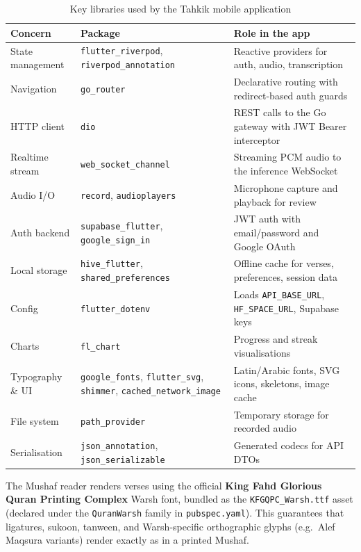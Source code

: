 \begin{table}[H]
  \centering
  \caption{Key libraries used by the Tahkik mobile application}
  \label{tab:impl_app_libs}
  \renewcommand{\arraystretch}{1.3}
  \begin{tabular}{lp{4.2cm}p{6cm}}
    \toprule
    \textbf{Concern} & \textbf{Package} & \textbf{Role in the app} \\
    \midrule
    State management & \texttt{flutter\_riverpod}, \texttt{riverpod\_annotation} & Reactive providers for auth, audio, transcription \\
    Navigation       & \texttt{go\_router}                & Declarative routing with redirect-based auth guards \\
    HTTP client      & \texttt{dio}                       & REST calls to the Go gateway with JWT Bearer interceptor \\
    Realtime stream  & \texttt{web\_socket\_channel}      & Streaming PCM audio to the inference WebSocket \\
    Audio I/O        & \texttt{record}, \texttt{audioplayers} & Microphone capture and playback for review \\
    Auth backend     & \texttt{supabase\_flutter}, \texttt{google\_sign\_in} & JWT auth with email/password and Google OAuth \\
    Local storage    & \texttt{hive\_flutter}, \texttt{shared\_preferences} & Offline cache for verses, preferences, session data \\
    Config           & \texttt{flutter\_dotenv}           & Loads \texttt{API\_BASE\_URL}, \texttt{HF\_SPACE\_URL}, Supabase keys \\
    Charts           & \texttt{fl\_chart}                 & Progress and streak visualisations \\
    Typography \& UI & \texttt{google\_fonts}, \texttt{flutter\_svg}, \texttt{shimmer}, \texttt{cached\_network\_image} & Latin/Arabic fonts, SVG icons, skeletons, image cache \\
    File system      & \texttt{path\_provider}            & Temporary storage for recorded audio \\
    Serialisation    & \texttt{json\_annotation}, \texttt{json\_serializable} & Generated codecs for API DTOs \\
    \bottomrule
  \end{tabular}
\end{table}

\begin{infobox}[title=Custom Warsh Font]
The Mushaf reader renders verses using the official \textbf{King Fahd Glorious Quran Printing Complex} Warsh font, bundled as the \texttt{KFGQPC\_Warsh.ttf} asset (declared under the \texttt{QuranWarsh} family in \texttt{pubspec.yaml}). This guarantees that ligatures, sukoon, tanween, and Warsh-specific orthographic glyphs (e.g.\ Alef Maqsura variants) render exactly as in a printed Mushaf.
\end{infobox}

